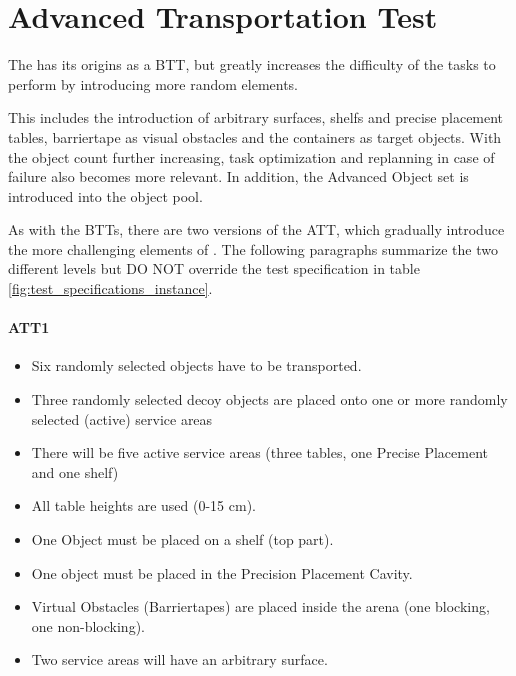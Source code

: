 
\section{Advanced Transportation Test}
\label{sec:Advanced Transportation Test}

The  has its origins as a BTT, but greatly increases the difficulty of the tasks to perform by introducing more random elements. 

This includes the introduction of arbitrary surfaces, shelfs and precise placement tables, barriertape as visual obstacles and the containers as target objects. With the object count further increasing, task optimization and replanning in case of failure also becomes more relevant. In addition, the Advanced Object set is introduced into the object pool.

As with the BTTs, there are two versions of the ATT, which gradually introduce the more challenging elements of \RCAW.
The following paragraphs summarize the two different levels but DO NOT override the test specification in table \ref{fig:test_specifications_instance}.

\paragraph{ATT1}
\begin{itemize}
\item Six randomly selected objects have to be transported.
\item Three randomly selected decoy objects are placed onto one or more randomly selected (active) service areas
\item There will be five active service areas (three tables, one Precise Placement and one shelf)
\item All table heights are used (0-15 $\si{\centi\meter}$).
\item One Object must be placed on a shelf (top part).
\item One object must be placed in the Precision Placement Cavity.
\item Virtual Obstacles (Barriertapes) are placed inside the arena (one blocking, one non-blocking).
\item Two service areas will have an arbitrary surface.
\end{itemize}

